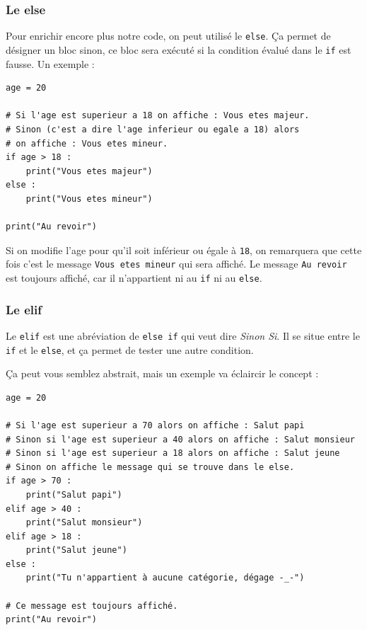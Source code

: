 \documentclass[12pt]{article}
\newcommand{\code}[1]{\colorbox{light-gray}{\texttt{#1}}}
\begin{document}
        \subsubsection{Le else}
            Pour enrichir encore plus notre code, on peut utilisé le \code{else}. Ça permet de désigner un bloc sinon, ce
            bloc sera exécuté si la condition évalué dans le \code{if} est fausse. Un exemple :
            \begin{lstlisting}[style=code, breaklines=false]
age = 20

# Si l'age est superieur a 18 on affiche : Vous etes majeur.
# Sinon (c'est a dire l'age inferieur ou egale a 18) alors 
# on affiche : Vous etes mineur.
if age > 18 :
    print("Vous etes majeur")
else :
    print("Vous etes mineur")

print("Au revoir")
            \end{lstlisting}

            Si on modifie l'age pour qu'il soit inférieur ou égale à \code{18}, on remarquera que cette fois c'est le message 
            \code{Vous etes mineur} qui sera affiché. Le message \code{Au revoir} est toujours affiché, car il n'appartient
            ni au \code{if} ni au \code{else}.

        \subsubsection{Le elif}
            Le \code{elif} est une abréviation de \code{else if} qui veut dire \emph{Sinon Si}. Il se situe entre le 
            \code{if} et le \code{else}, et ça permet de tester une autre condition.

            Ça peut vous semblez abstrait, mais un exemple va éclaircir le concept :
            \begin{lstlisting}[style=code, breaklines=false]
age = 20

# Si l'age est superieur a 70 alors on affiche : Salut papi
# Sinon si l'age est superieur a 40 alors on affiche : Salut monsieur
# Sinon si l'age est superieur a 18 alors on affiche : Salut jeune
# Sinon on affiche le message qui se trouve dans le else.
if age > 70 :
    print("Salut papi")
elif age > 40 :
    print("Salut monsieur")
elif age > 18 :
    print("Salut jeune")
else :
    print("Tu n'appartient à aucune catégorie, dégage -_-")

# Ce message est toujours affiché.
print("Au revoir")
                
            \end{lstlisting}
\end{document}
